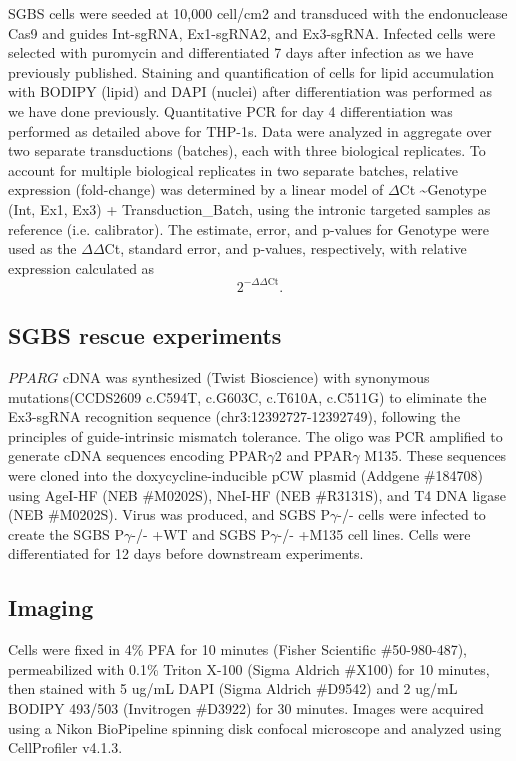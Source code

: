 SGBS cells were seeded at 10,000 cell/cm2 and transduced with the endonuclease Cas9 and guides Int-sgRNA, Ex1-sgRNA2, and Ex3-sgRNA. Infected cells were selected with puromycin and differentiated 7 days after infection as we have previously published\cite{Jiao2019-ng}. Staining and quantification of cells for lipid accumulation with BODIPY (lipid) and DAPI (nuclei) after differentiation was performed as we have done previously\cite{Majithia2014-op}. Quantitative PCR for day 4 differentiation was performed as detailed above for THP-1s. Data were analyzed in aggregate over two separate transductions (batches), each with three biological replicates. To account for multiple biological replicates in two separate batches, relative expression (fold-change) was determined by a linear model of $\Delta$Ct \textasciitilde Genotype (Int, Ex1, Ex3) + Transduction\_Batch, using the intronic targeted samples as reference (i.e. calibrator). The estimate, error, and p-values for Genotype were used as the $\Delta\Delta$Ct, standard error, and p-values, respectively, with relative expression calculated as \[2^{-\Delta\Delta\mathrm{Ct}}.\]

\subsection{SGBS rescue experiments}

\(PPARG\) cDNA was synthesized (Twist Bioscience) with synonymous mutations\newline (CCDS2609 c.C594T, c.G603C, c.T610A, c.C511G) to eliminate the Ex3-sgRNA recognition sequence (chr3:12392727-12392749), following the principles of guide-intrinsic mismatch tolerance\cite{Fu2022-jh}. The oligo was PCR amplified to generate cDNA sequences encoding PPAR$\gamma$2 and PPAR$\gamma$ M135. These sequences were cloned into the doxycycline-inducible pCW plasmid (Addgene \#184708) using AgeI-HF (NEB \#M0202S), NheI-HF (NEB \#R3131S), and T4 DNA ligase (NEB \#M0202S). Virus was produced, and SGBS P$\gamma$-/- cells were infected to create the SGBS P$\gamma$-/- +WT and SGBS P$\gamma$-/- +M135 cell lines. Cells were differentiated for 12 days before downstream experiments.

\subsection{Imaging}
Cells were fixed in 4\% PFA for 10 minutes (Fisher Scientific \#50-980-487), permeabilized with 0.1\% Triton X-100 (Sigma Aldrich \#X100) for 10 minutes, then stained with 5 ug/mL DAPI (Sigma Aldrich \#D9542) and 2 ug/mL BODIPY 493/503 (Invitrogen \#D3922) for 30 minutes. Images were acquired using a Nikon BioPipeline spinning disk confocal microscope and analyzed using CellProfiler v4.1.3\cite{Carpenter2006-vm}.

